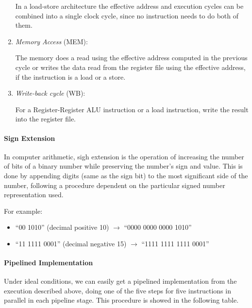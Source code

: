 \documentclass[12pt, a4paper]{article}
\theoremstyle{margin}
\begin{document}
\begin{enumerate}
		  In a load-store architecture the effective address and execution cycles can be combined into a single clock cycle, since no instruction needs to do both of them.

		  \item \emph{Memory Access} (MEM):

		  The memory does a read using the effective address computed in the previous cycle or writes the data read from the register file using the effective address, if the instruction is a load or a store.

		  \item \emph{Write-back cycle} (WB):

		  For a Register-Register ALU instruction or a load instruction, write the result into the register file.
		\end{enumerate}

	  \paragraph{Sign Extension} In computer arithmetic, sigh extension is the operation of increasing the number of bits of a binary number while preserving the number's sign and value. This is done by appending digits (same as the sign bit) to the most significant side of the number, following a procedure dependent on the particular signed number representation used.
	  
	  For example:
		\begin{itemize}
		  \item ``00 1010'' (decimal positive 10) $\rightarrow$ ``0000 0000 0000 1010''
		  \item ``11 1111 0001'' (decimal negative 15) $\rightarrow$ ``1111 1111 1111 0001''
		\end{itemize}

	  \paragraph{Pipelined Implementation\cite{caqa}}
	  Under ideal conditions, we can easily get a pipelined implementation from the execution described above, doing one of the five steps for five instructions in parallel in each pipeline stage. This procedure is showed in the following table.
	  
\end{document}
